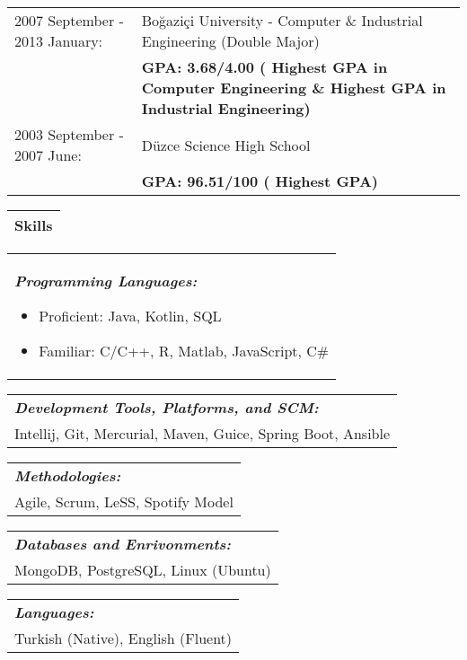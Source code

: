 \documentclass[11pt]{article}
\newcommand{\bigspace}{\vspace{0.4cm}}
\begin{document}
\begin{tabular}{p{5.5cm} p{12.5cm}}
\\
2007 September - 2013 January:
&	Bo\u{g}azi\c{c}i University - Computer \& Industrial Engineering (Double Major)\\
&	\textbf{GPA: 3.68/4.00 (\nth{3} Highest GPA in Computer Engineering \& \nth{4} Highest GPA in Industrial Engineering)}\\


2003 September - 2007 June:
&	D\"{u}zce Science High School\\
&	\textbf{GPA: 96.51/100 (\nth{3} Highest GPA)}
\end{tabular}


\begin{tabular}{p{18cm}}
\textbf{Skills} \\
\hline
\end{tabular}

\bigspace
\begin{tabular}{p{18cm}}
\textit{\textbf{Programming Languages:}}
\vspace{-7pt}
\begin{itemize}
\setlength\itemsep{0em}
\item Proficient: Java, Kotlin, SQL
\item Familiar: C/C++, R, Matlab, JavaScript, C\#
\end{itemize}
\end{tabular}

\begin{tabular}{p{18cm}}
\textit{\textbf{Development Tools, Platforms, and SCM:}} \\
Intellij, Git, Mercurial, Maven, Guice, Spring Boot, Ansible
\end{tabular}

\bigspace

\begin{tabular}{p{18cm}}
\textit{\textbf{Methodologies:}} \\
Agile, Scrum, LeSS, Spotify Model
\end{tabular}

\bigspace

\begin{tabular}{p{18cm}}
\textit{\textbf{Databases and Enrivonments:}} \\
MongoDB, PostgreSQL, Linux (Ubuntu)
\end{tabular}

\bigspace

\begin{tabular}{p{18cm}}
\textit{\textbf{Languages:}}\\
Turkish (Native), English (Fluent)
\end{tabular}
\end{document}
